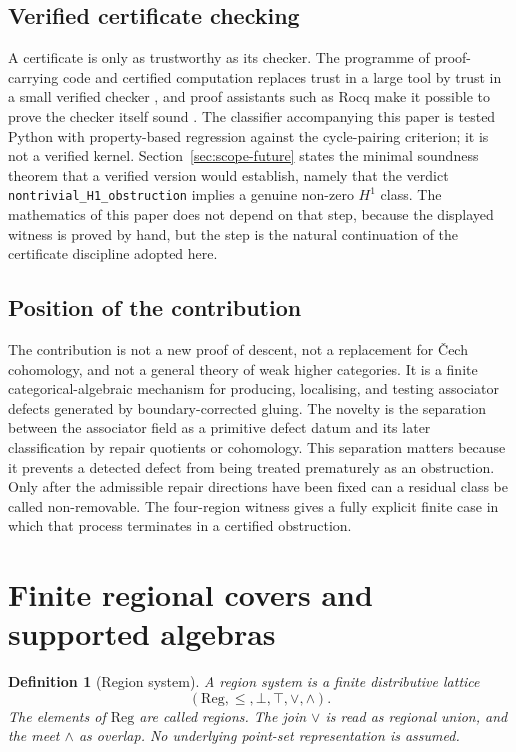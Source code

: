 \documentclass[11pt]{article}
\newtheorem{definition}[theorem]{Definition}
\newcommand{\Reg}{\mathrm{Reg}}
\begin{document}
\subsection{Verified certificate checking}

A certificate is only as trustworthy as its checker. The programme of proof-carrying code and certified computation replaces trust in a large tool by trust in a small verified checker \cite{Necula1997}, and proof assistants such as Rocq make it possible to prove the checker itself sound \cite{Rocq2025}. The classifier accompanying this paper is tested Python with property-based regression against the cycle-pairing criterion; it is not a verified kernel. Section~\ref{sec:scope-future} states the minimal soundness theorem that a verified version would establish, namely that the verdict \texttt{nontrivial\_H1\_obstruction} implies a genuine non-zero \(H^1\) class. The mathematics of this paper does not depend on that step, because the displayed witness is proved by hand, but the step is the natural continuation of the certificate discipline adopted here.

\subsection{Position of the contribution}

The contribution is not a new proof of descent, not a replacement for \v{C}ech cohomology, and not a general theory of weak higher categories. It is a finite categorical-algebraic mechanism for producing, localising, and testing associator defects generated by boundary-corrected gluing. The novelty is the separation between the associator field as a primitive defect datum and its later classification by repair quotients or cohomology. This separation matters because it prevents a detected defect from being treated prematurely as an obstruction. Only after the admissible repair directions have been fixed can a residual class be called non-removable. The four-region witness gives a fully explicit finite case in which that process terminates in a certified obstruction.

\section{Finite regional covers and supported algebras}
\label{sec:regions}

\begin{definition}[Region system]
A region system is a finite distributive lattice
\[
(\Reg,\leq,\bot,\top,\vee,\wedge).
\]
The elements of \(\Reg\) are called regions. The join \(\vee\) is read as regional union, and the meet \(\wedge\) as overlap. No underlying point-set representation is assumed.
\end{definition}
\end{document}
